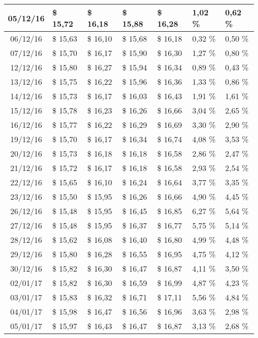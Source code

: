 \begin{center}
\begin{longtable}{|c|p{1.5cm}|p{1.5cm}|p{1.5cm}|p{1.5cm}|p{1.5cm}|p{1.5cm}|}
05/12/16 & \$ 15,72 & \$ 16,18 & \$ 15,88 & \$ 16,28 & 1,02 \% & 0,62 \% \\ \hline
06/12/16 & \$ 15,63 & \$ 16,10 & \$ 15,68 & \$ 16,18 & 0,32 \% & 0,50 \% \\ \hline
07/12/16 & \$ 15,70 & \$ 16,17 & \$ 15,90 & \$ 16,30 & 1,27 \% & 0,80 \% \\ \hline
12/12/16 & \$ 15,80 & \$ 16,27 & \$ 15,94 & \$ 16,34 & 0,89 \% & 0,43 \% \\ \hline
13/12/16 & \$ 15,75 & \$ 16,22 & \$ 15,96 & \$ 16,36 & 1,33 \% & 0,86 \% \\ \hline
14/12/16 & \$ 15,73 & \$ 16,17 & \$ 16,03 & \$ 16,43 & 1,91 \% & 1,61 \% \\ \hline
15/12/16 & \$ 15,78 & \$ 16,23 & \$ 16,26 & \$ 16,66 & 3,04 \% & 2,65 \% \\ \hline
16/12/16 & \$ 15,77 & \$ 16,22 & \$ 16,29 & \$ 16,69 & 3,30 \% & 2,90 \% \\ \hline
19/12/16 & \$ 15,70 & \$ 16,17 & \$ 16,34 & \$ 16,74 & 4,08 \% & 3,53 \% \\ \hline
20/12/16 & \$ 15,73 & \$ 16,18 & \$ 16,18 & \$ 16,58 & 2,86 \% & 2,47 \% \\ \hline
21/12/16 & \$ 15,72 & \$ 16,17 & \$ 16,18 & \$ 16,58 & 2,93 \% & 2,54 \% \\ \hline
22/12/16 & \$ 15,65 & \$ 16,10 & \$ 16,24 & \$ 16,64 & 3,77 \% & 3,35 \% \\ \hline
23/12/16 & \$ 15,50 & \$ 15,95 & \$ 16,26 & \$ 16,66 & 4,90 \% & 4,45 \% \\ \hline
26/12/16 & \$ 15,48 & \$ 15,95 & \$ 16,45 & \$ 16,85 & 6,27 \% & 5,64 \% \\ \hline
27/12/16 & \$ 15,48 & \$ 15,95 & \$ 16,37 & \$ 16,77 & 5,75 \% & 5,14 \% \\ \hline
28/12/16 & \$ 15,62 & \$ 16,08 & \$ 16,40 & \$ 16,80 & 4,99 \% & 4,48 \% \\ \hline
29/12/16 & \$ 15,80 & \$ 16,28 & \$ 16,55 & \$ 16,95 & 4,75 \% & 4,12 \% \\ \hline
30/12/16 & \$ 15,82 & \$ 16,30 & \$ 16,47 & \$ 16,87 & 4,11 \% & 3,50 \% \\ \hline
02/01/17 & \$ 15,82 & \$ 16,30 & \$ 16,59 & \$ 16,99 & 4,87 \% & 4,23 \% \\ \hline
03/01/17 & \$ 15,83 & \$ 16,32 & \$ 16,71 & \$ 17,11 & 5,56 \% & 4,84 \% \\ \hline
04/01/17 & \$ 15,98 & \$ 16,47 & \$ 16,56 & \$ 16,96 & 3,63 \% & 2,98 \% \\ \hline
05/01/17 & \$ 15,97 & \$ 16,43 & \$ 16,47 & \$ 16,87 & 3,13 \% & 2,68 \% \\ \hline

\end{longtable}
\end{center}
